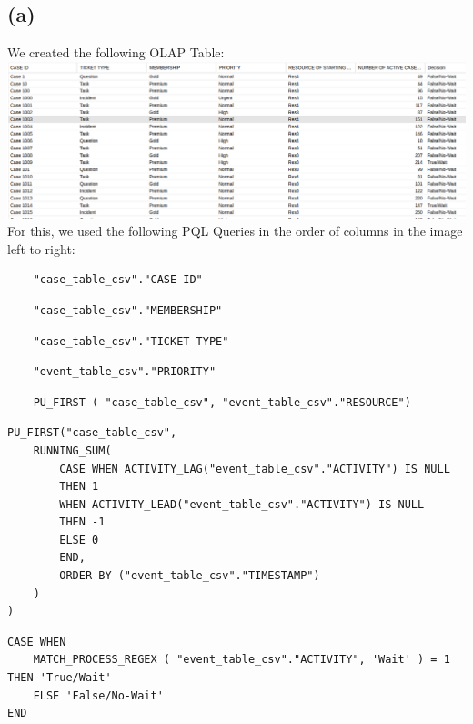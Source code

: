 \documentclass[../../main.tex]{subfiles}
\begin{document}
\subsection*{(a)}
We created the following OLAP Table:\\
\includegraphics[width=\columnwidth]{img/Celonis_a_OLAP_Table.png}\\
For this, we used the following PQL Queries in the order of columns in the image left to right:
\begin{verbatim}
	"case_table_csv"."CASE ID"
\end{verbatim}
\begin{verbatim}
	"case_table_csv"."MEMBERSHIP"
\end{verbatim}
\begin{verbatim}
	"case_table_csv"."TICKET TYPE"
\end{verbatim}
\begin{verbatim}
	"event_table_csv"."PRIORITY"
\end{verbatim}
\begin{verbatim}
	PU_FIRST ( "case_table_csv", "event_table_csv"."RESOURCE")
\end{verbatim}
\begin{verbatim}
PU_FIRST("case_table_csv",
	RUNNING_SUM(
		CASE WHEN ACTIVITY_LAG("event_table_csv"."ACTIVITY") IS NULL
		THEN 1
		WHEN ACTIVITY_LEAD("event_table_csv"."ACTIVITY") IS NULL
		THEN -1
		ELSE 0
		END,
		ORDER BY ("event_table_csv"."TIMESTAMP")
	)
)
\end{verbatim}
\begin{verbatim}
CASE WHEN
	MATCH_PROCESS_REGEX ( "event_table_csv"."ACTIVITY", 'Wait' ) = 1 THEN 'True/Wait'
	ELSE 'False/No-Wait'
END
\end{verbatim}
\end{document}
